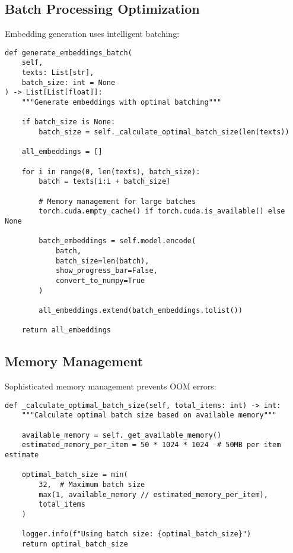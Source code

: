 \documentclass[10pt,a4paper,twocolumn]{article}
\begin{document}
\subsection{Batch Processing Optimization}

Embedding generation uses intelligent batching:

\begin{lstlisting}[caption={Batch Processing Implementation}]
def generate_embeddings_batch(
    self, 
    texts: List[str], 
    batch_size: int = None
) -> List[List[float]]:
    """Generate embeddings with optimal batching"""
    
    if batch_size is None:
        batch_size = self._calculate_optimal_batch_size(len(texts))
    
    all_embeddings = []
    
    for i in range(0, len(texts), batch_size):
        batch = texts[i:i + batch_size]
        
        # Memory management for large batches
        torch.cuda.empty_cache() if torch.cuda.is_available() else None
        
        batch_embeddings = self.model.encode(
            batch,
            batch_size=len(batch),
            show_progress_bar=False,
            convert_to_numpy=True
        )
        
        all_embeddings.extend(batch_embeddings.tolist())
    
    return all_embeddings
\end{lstlisting}

\subsection{Memory Management}

Sophisticated memory management prevents OOM errors:

\begin{lstlisting}[caption={Memory Management Strategy}]
def _calculate_optimal_batch_size(self, total_items: int) -> int:
    """Calculate optimal batch size based on available memory"""
    
    available_memory = self._get_available_memory()
    estimated_memory_per_item = 50 * 1024 * 1024  # 50MB per item estimate
    
    optimal_batch_size = min(
        32,  # Maximum batch size
        max(1, available_memory // estimated_memory_per_item),
        total_items
    )
    
    logger.info(f"Using batch size: {optimal_batch_size}")
    return optimal_batch_size
\end{lstlisting}
\end{document}
